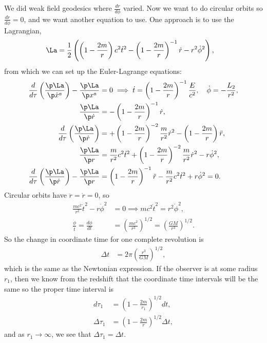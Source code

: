\documentclass[a4paper, 11pt, normalem]{report}
\begin{document}
We did weak field geodesics where $\frac{dr}{d\phi}$ varied. 
Now we want to do circular orbits so $\frac{dr}{d\phi}=0$, and we want another equation to use. 
One approach is to use the Lagrangian,
\begin{align}
    \La &= \frac12\left(\left(1-\frac{2m}{r}\right)c^2\dot{t}^2 - \left(1-\frac{2m}{r}\right)^{-1}\dot{r} -r^2\dot{\phi}^2\right),
\end{align}
from which we can set up the Euler-Lagrange equations:
\begin{align}
    \frac{d}{d\tau}\left(\frac{\p\La}{\p\dot{x}^a}\right) - \frac{\p\La}{\p x^a} &= 0 \implies \dot{t} = \left(1-\frac{2m}{r}\right)^{-1}\frac{E}{c^2},\quad \dot{\phi} = -\frac{L_2}{r^2},\\
    \frac{\p\La}{\p\dot{r}} &= -\left(1-\frac{2m}{r}\right)^{-1}\dot{r}, \\
    \frac{d}{d\tau}\left(\frac{\p\La}{\p\dot{r}}\right) &= +\left(1-\frac{2m}{r}\right)^{-2}\frac{m}{r^2}\dot{r}^2 - \left(1-\frac{2m}{r}\right)\ddot{r}, \\
    \frac{\p\La}{\p r} &= \frac{m}{r^2}c^2\dot{t}^2 + \left(1-\frac{2m}{r}\right)^{-2}\frac{m}{r^2}\dot{r}^2 - r\dot{\phi}^2, \\
    \frac{d}{d\tau}\left(\frac{\p\La}{\p\dot{r}}\right)-\frac{\p\La}{\p r} &= \left(1-\frac{2m}{r}\right)^{-1}\ddot{r} - \frac{m}{r^2}c^2\dot{t}^2 + r\dot{\phi}^2 = 0. 
\end{align}
Circular orbits have $\ddot{r}=\dot{r}=0$, so
\begin{align}
    \frac{mc^2}{r^2}\dot{t}^2 - r\dot{\phi}^2 &= 0 \implies mc^2\dot{t}^2 = r^2\dot{\phi}^2, \\
    \frac{\dot{\phi}}{\dot{t}} = \frac{d\phi}{dt} &= \left(\frac{mc^2}{r^3}\right)^{1/2} = \left(\frac{GM}{r^3}\right)^{1/2}. 
\end{align}
So the change in coordinate time for one complete revolution is 
\begin{align}
    \Delta t &= 2\pi\left(\frac{r^3}{GM}\right)^{1/2},
\end{align}
which is the same as the Newtonian expression. 
If the observer is at some radius $r_1$, then we know from the redshift that the coordinate time intervals will be the same so the proper time interval is
\begin{align}
    d\tau_1 &= \left(1-\frac{2m}{r_1}\right)^{1/2}dt,\\
    \Delta\tau_1 &= \left(1-\frac{2m}{r}\right)^{1/2}\Delta t,
\end{align}
and as $r_1\to\infty$, we see that $\Delta\tau_1=\Delta t$. 
\end{document}
